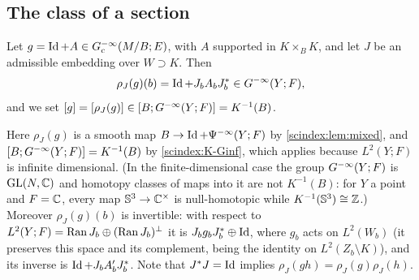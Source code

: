 \subsection{The class of a section}
\begin{definition}\label{scindex:def:class}
  Let $g=\operatorname{Id}+A\in G^{-\infty}_{\mathrm c}(M/B;E)$, with $A$ supported in $K\times_BK$,
  and let $J$ be an admissible embedding over $W\supset K$. Then
  \begin{equation*}
    \rho_J(g)(b)=\operatorname{Id}+J_bA_bJ_b^*\in G^{-\infty}(Y;F),
  \end{equation*}
  and we set $[g]=[\rho_J(g)]\in[B;G^{-\infty}(Y;F)]=K^{-1}(B)$.
\end{definition}
Here $\rho_J(g)$ is a smooth map $B\to\operatorname{Id}+\Psi^{-\infty}(Y;F)$ by
\cref{scindex:lem:mixed}, and $[B;G^{-\infty}(Y;F)]=K^{-1}(B)$ by
\ref{scindex:K-Ginf}, which applies because $L^2(Y;F)$ is infinite dimensional.
(In the finite-dimensional case the group $G^{-\infty}(Y;F)$ is $\operatorname{GL}(N,\mathbb{C})$ and homotopy classes of
maps into it are not $K^{-1}(B)$: for $Y$ a point and $F=\mathbb{C}$, every map
$\mathbb{S}^3\to\mathbb{C}^\times$ is null-homotopic while $K^{-1}(\mathbb{S}^3)\cong\mathbb{Z}$.)
Moreover $\rho_J(g)(b)$ is invertible: with respect to $L^2(Y;F)=\operatorname{Ran} J_b\oplus
(\operatorname{Ran} J_b)^\perp$ it is $J_bg_bJ_b^*\oplus\operatorname{Id}$, where $g_b$ acts on $L^2(W_b)$ (it
preserves this space and its complement, being the identity on
$L^2(Z_b\setminus K)$), and its inverse is $\operatorname{Id}+J_bA'_bJ_b^*$. Note that
$J^*J=\operatorname{Id}$ implies $\rho_J(gh)=\rho_J(g)\rho_J(h)$.

